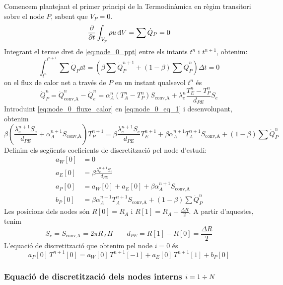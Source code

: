 Comencem plantejant el primer principi de la Termodinàmica en règim transitori sobre el node $P$, sabent que $V_P = 0$.
\begin{equation} \label{eq:node_0_ppt}
	\pdv{t} \int_{V_p} \rho u \dd{V} = \sum \dot{Q}_P = 0
\end{equation}
Integrant el terme dret de \ref{eq:node_0_ppt} entre els intants $t^n$ i $t^{n+1}$, obtenim:
\begin{equation} \label{eq:node_0_eq_1}
	\int_{t^{n}}^{t^{n+1}} \sum \dot{Q}_P \dd{t} =
	\left( \beta \sum \dot{Q}_P^{n+1} + (1 - \beta) \sum \dot{Q}_P^n \right) \Delta t = 0
\end{equation}
on el flux de calor net a través de $P$ en un instant qualsevol $t^n$ és
\begin{equation} \label{eq:node_0_fluxe_calor}
	\dot{Q}_P^n = 
	\dot{Q}_\text{conv,A}^n - \dot{Q}_e^n =
	\alpha_A^n \left( T_A^n - T_P^n \right) S_\text{conv,A} + \lambda_e^n \frac{T_E^n - T_P^n}{d_{PE}} S_e
\end{equation}
Introduint \eqref{eq:node_0_fluxe_calor} en \eqref{eq:node_0_eq_1} i desenvolupant, obtenim
\begin{equation}
	\beta \left( \frac{\lambda_e^{n+1} S_e}{d_{PE}} + \alpha_A^{n+1} S_\text{conv,A} \right) T_P^{n+1} = 
	\beta \frac{\lambda_e^{n+1} S_e}{d_{PE}} T_E^{n+1} + 
	\beta \alpha_A^{n+1} T_A^{n+1} S_\text{conv,A} + 
	\left( 1 - \beta \right) \sum \dot{Q}_P^n
\end{equation}
Definim els següents coeficients de discretització pel node d'estudi:
\begin{align}
	a_W[0] &= 0												\\
	a_E[0] &= \beta \frac{\lambda_e^{n+1} S_e}{d_{PE}} 		\\
	a_P[0] &= a_W[0] + a_E[0] + \beta \alpha_A^{n+1} S_\text{conv,A}  	\\
	b_P[0] &= \beta \alpha_A^{n+1} T_A^{n+1} S_\text{conv,A} + (1 - \beta) \sum \dot{Q}_P^n
\end{align}
Les posicions dels nodes són $R[0] = R_A$ i $R[1] = R_A + \frac{\Delta R}{2}$. A partir d'aquestes, tenim
\[
	S_e = S_\text{conv,A} = 2 \pi R_A H \qquad d_{PE} = R[1] - R[0] = \frac{\Delta R}{2}
\]
L'equació de discretització que obtenim pel node $i = 0$ és
\begin{equation}
	a_P[0] \, T^{n+1}[0] = a_W[0] \, T^{n+1}[-1] + a_E[0] \, T^{n+1}[1] + b_P[0]
\end{equation}

\subsubsection{Equació de discretització dels nodes interns \texorpdfstring{$i = 1 \divisionsymbol N$}{(1 a N)}}

